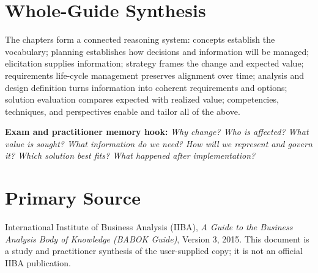 \documentclass[11pt]{article}
\begin{document}
\section{Whole-Guide Synthesis}
The chapters form a connected reasoning system: concepts establish the vocabulary; planning establishes how decisions and information will be managed; elicitation supplies information; strategy frames the change and expected value; requirements life-cycle management preserves alignment over time; analysis and design definition turns information into coherent requirements and options; solution evaluation compares expected with realized value; competencies, techniques, and perspectives enable and tailor all of the above.

\begin{practicebox}
\textbf{Exam and practitioner memory hook:} \emph{Why change? Who is affected? What value is sought? What information do we need? How will we represent and govern it? Which solution best fits? What happened after implementation?}
\end{practicebox}

\section*{Primary Source}
International Institute of Business Analysis (IIBA), \emph{A Guide to the Business Analysis Body of Knowledge (BABOK Guide)}, Version 3, 2015. This document is a study and practitioner synthesis of the user-supplied copy; it is not an official IIBA publication.
\end{document}
